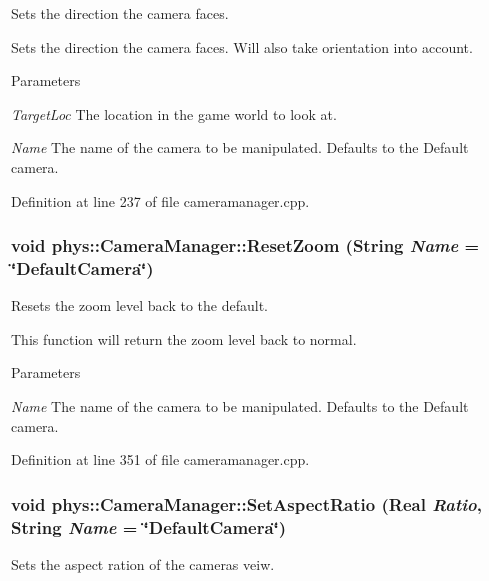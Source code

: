 Sets the direction the camera faces. 

Sets the direction the camera faces. Will also take orientation into account. 
\begin{DoxyParams}{Parameters}
\item[{\em TargetLoc}]The location in the game world to look at. \item[{\em Name}]The name of the camera to be manipulated. Defaults to the Default camera. \end{DoxyParams}


Definition at line 237 of file cameramanager.cpp.

\hypertarget{classphys_1_1CameraManager_a1cfaf4720fa9af7c0f234d6a2f26e179}{
\subsubsection[{ResetZoom}]{\setlength{\rightskip}{0pt plus 5cm}void phys::CameraManager::ResetZoom ({\bf String} {\em Name} = {\ttfamily \char`\"{}DefaultCamera\char`\"{}})}}
\label{d9/d91/classphys_1_1CameraManager_a1cfaf4720fa9af7c0f234d6a2f26e179}


Resets the zoom level back to the default. 

This function will return the zoom level back to normal. 
\begin{DoxyParams}{Parameters}
\item[{\em Name}]The name of the camera to be manipulated. Defaults to the Default camera. \end{DoxyParams}


Definition at line 351 of file cameramanager.cpp.

\hypertarget{classphys_1_1CameraManager_af16862039fffd900b9c7acc20527cac8}{
\subsubsection[{SetAspectRatio}]{\setlength{\rightskip}{0pt plus 5cm}void phys::CameraManager::SetAspectRatio ({\bf Real} {\em Ratio}, \/  {\bf String} {\em Name} = {\ttfamily \char`\"{}DefaultCamera\char`\"{}})}}
\label{d9/d91/classphys_1_1CameraManager_af16862039fffd900b9c7acc20527cac8}


Sets the aspect ration of the cameras veiw. 

